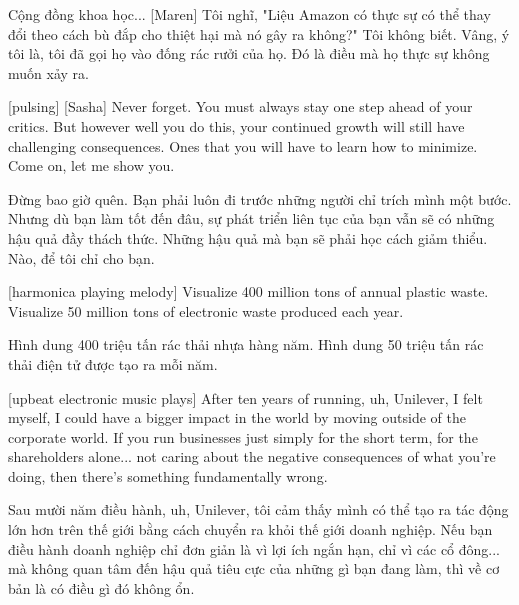 \documentclass[a4paper]{article}
\begin{document}
	\begin{vietnamese-v2}
		Cộng đồng khoa học...
		[Maren] Tôi nghĩ, "Liệu Amazon có thực sự có thể thay đổi theo cách bù đắp cho thiệt hại mà nó gây ra không?"
		Tôi không biết.
		Vâng, ý tôi là, tôi đã gọi họ vào đống rác rưởi của họ.
		Đó là điều mà họ thực sự không muốn xảy ra.
	\end{vietnamese-v2}
	
	[pulsing]
	[Sasha] Never forget.
	You must always stay one step ahead of your critics.
	But however well you do this, your continued growth will still have challenging consequences.
	Ones that you will have to learn how to minimize.
	Come on, let me show you.
	
	\begin{vietnamese-v2}
		 Đừng bao giờ quên.
		Bạn phải luôn đi trước những người chỉ trích mình một bước.
		Nhưng dù bạn làm tốt đến đâu, sự phát triển liên tục của bạn vẫn sẽ có những hậu quả đầy thách thức.
		Những hậu quả mà bạn sẽ phải học cách giảm thiểu.
		Nào, để tôi chỉ cho bạn.
	\end{vietnamese-v2}
	
	[harmonica playing melody]
	Visualize 400 million tons of annual plastic waste.
	Visualize 50 million tons of electronic waste produced each year.
	
	\begin{vietnamese-v2}
		Hình dung 400 triệu tấn rác thải nhựa hàng năm.
		Hình dung 50 triệu tấn rác thải điện tử được tạo ra mỗi năm.
	\end{vietnamese-v2}
	
	[upbeat electronic music plays]
	After ten years of running, uh, Unilever, I felt myself, I could have a bigger impact in the world by moving outside of the corporate world.
	If you run businesses just simply for the short term, for the shareholders alone... not caring about the negative consequences of what you're doing, then there's something fundamentally wrong.
	
	\begin{vietnamese-v2}
		Sau mười năm điều hành, uh, Unilever, tôi cảm thấy mình có thể tạo ra tác động lớn hơn trên thế giới bằng cách chuyển ra khỏi thế giới doanh nghiệp.
		Nếu bạn điều hành doanh nghiệp chỉ đơn giản là vì lợi ích ngắn hạn, chỉ vì các cổ đông... mà không quan tâm đến hậu quả tiêu cực của những gì bạn đang làm, thì về cơ bản là có điều gì đó không ổn.
	\end{vietnamese-v2}
	
\end{document}

